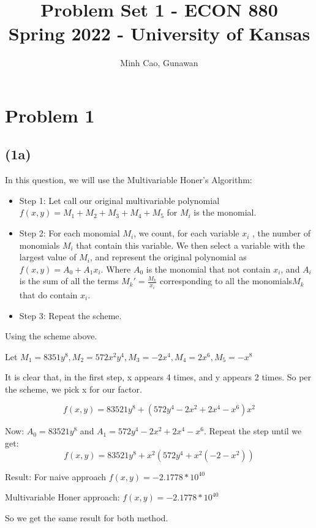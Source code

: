 \documentclass[11pt]{article}
\title{Problem Set 1 - ECON 880\\
	\small Spring 2022 - University of Kansas}
\author{Minh Cao, Gunawan}
\newcommand{\1}{\mathbbm{1}}
\begin{document}
\maketitle	
\section*{Problem 1}
\subsection*{(1a)}
In this question, we will use the Multivariable Honer's Algorithm:\\
\begin{itemize}
\item Step 1: Let call our original multivariable polynomial $f(x,y) = M_{1} +M_{2}+M_{3}+M_{4}+M_{5}$ for $M_{i}$ is the monomial.\\
\item Step 2: For each monomial $M_{i}$, we count, for each variable $x_{i}$ , the number of monomials $M_{i}$
that contain this variable. We then select a variable with the largest value of $M_{i}$,  and represent the original
polynomial as $f(x,y) = A_{0}+A_{1}x_{i}$. Where $A_{0}$ is the monomial that not contain $x_{i}$, and $A_{i}$ is the sum of all the terms ${M_{k}}' = \frac{M_{k}}{x_{i}} $ corresponding to all the monomials$M_{k}$ that do contain $x_{i}$.\\
\item Step 3: Repeat the scheme.
\end{itemize}

Using the scheme above.

Let $M_{1} = 8351y^{8}, M_{2} = 572x^{2}y^{4}, M_{3}= -2x^{4}, M_{4}=2x^{6}, M_{5} = -x^{8}$

It is clear that, in the first step, x appears 4 times, and y appears  2 times. So per the scheme, we pick x for our factor.

$$f(x,y) = 83521y^8 + (572y^{4} - 2x^{2}+2x^{4}-x^{6})x^{2} $$

Now: $A_{0} = 83521y^8$ and $A_{1} = 572y^{4} - 2x^{2}+2x^{4}-x^{6}$. Repeat the step until we get:
$$f(x,y) = 83521y^8 +x^{2} (572y^{4} +x^{2}(-2-x^{2}))$$

Result: For naive approach $f(x,y) = -2.1778 * 10^{40}$

Multivariable Honer approach: $f(x,y) = -2.1778  * 10^{40}$

So we get the same result for both method.
\end{document}
